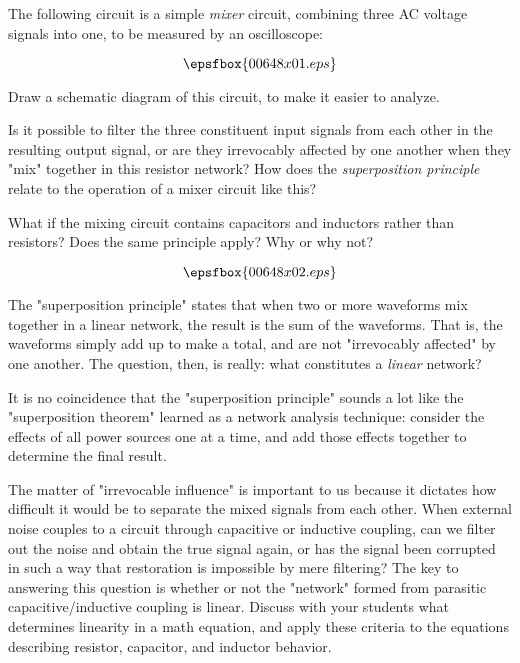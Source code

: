 

The following circuit is a simple {\it mixer} circuit, combining three AC voltage signals into one, to be measured by an oscilloscope:

$$\epsfbox{00648x01.eps}$$

Draw a schematic diagram of this circuit, to make it easier to analyze.

Is it possible to filter the three constituent input signals from each other in the resulting output signal, or are they irrevocably affected by one another when they "mix" together in this resistor network?  How does the {\it superposition principle} relate to the operation of a mixer circuit like this?

What if the mixing circuit contains capacitors and inductors rather than resistors?  Does the same principle apply?  Why or why not?







$$\epsfbox{00648x02.eps}$$

The "superposition principle" states that when two or more waveforms mix together in a linear network, the result is the sum of the waveforms.  That is, the waveforms simply add up to make a total, and are not "irrevocably affected" by one another.  The question, then, is really: what constitutes a {\it linear} network?







It is no coincidence that the "superposition principle" sounds a lot like the "superposition theorem" learned as a network analysis technique: consider the effects of all power sources one at a time, and add those effects together to determine the final result.

The matter of "irrevocable influence" is important to us because it dictates how difficult it would be to separate the mixed signals from each other.  When external noise couples to a circuit through capacitive or inductive coupling, can we filter out the noise and obtain the true signal again, or has the signal been corrupted in such a way that restoration is impossible by mere filtering?  The key to answering this question is whether or not the "network" formed from parasitic capacitive/inductive coupling is linear.  Discuss with your students what determines linearity in a math equation, and apply these criteria to the equations describing resistor, capacitor, and inductor behavior.




